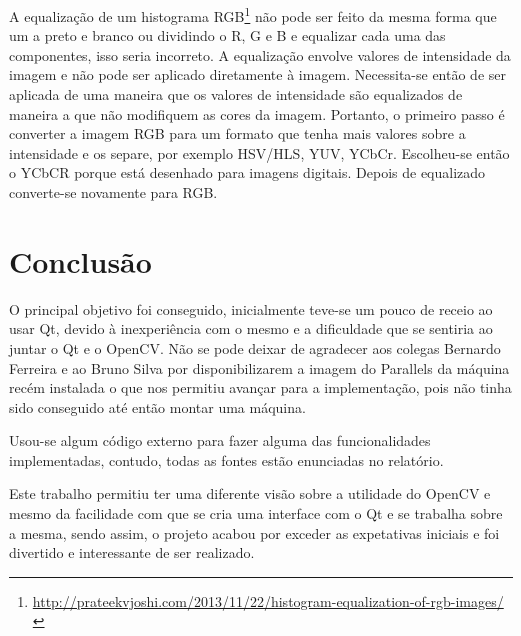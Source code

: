 \documentclass[pdftex,12pt,a4paper]{report}
\begin{document}
A equalização de um histograma RGB\footnote{\label{url5} \url{http://prateekvjoshi.com/2013/11/22/histogram-equalization-of-rgb-images/}} não pode ser feito da mesma forma que um a preto e branco ou dividindo o R, G e B e equalizar cada uma das componentes, isso seria incorreto. A equalização envolve valores de intensidade da imagem e não pode ser aplicado diretamente à imagem. Necessita-se então de ser aplicada de uma maneira que os valores de intensidade são equalizados de maneira a que não modifiquem as cores da imagem. Portanto, o primeiro passo é converter a imagem RGB para um formato que tenha mais valores sobre a intensidade e os separe, por exemplo HSV/HLS, YUV, YCbCr. Escolheu-se então o YCbCR porque está desenhado para imagens digitais. Depois de equalizado converte-se novamente para RGB.

\section{Conclusão}

O principal objetivo foi conseguido, inicialmente teve-se um pouco de receio ao usar Qt, devido à inexperiência com o mesmo e a dificuldade que se sentiria ao juntar o Qt e o OpenCV. Não se pode deixar de agradecer aos colegas Bernardo Ferreira e ao Bruno Silva por disponibilizarem a imagem do Parallels da máquina recém instalada o que nos permitiu avançar para a implementação, pois não tinha sido conseguido até então montar uma máquina. 

Usou-se algum código externo para fazer alguma das funcionalidades implementadas, contudo, todas as fontes estão enunciadas no relatório. 

Este trabalho permitiu ter uma diferente visão sobre a utilidade do OpenCV e mesmo da facilidade com que se cria uma interface com o Qt e se trabalha sobre a mesma, sendo assim, o projeto acabou por exceder as expetativas iniciais e foi divertido e interessante de ser realizado.
\end{document}
